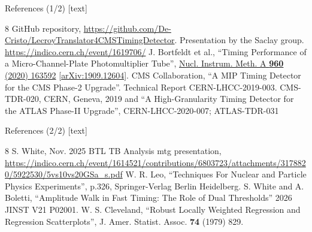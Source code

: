 \begin{frame}{References (1/2)}
\fontsize{9}{10.5}\selectfont
{}[text]
\begin{thebibliography}{8}
GitHub repository,
\url{https://github.com/De-Cristo/LecroyTranslator4CMSTimingDetector}.
Presentation by the Saclay group. \url{https://indico.cern.ch/event/1619706/}
J. Bortfeldt et al., ``Timing Performance of a Micro-Channel-Plate Photomultiplier Tube'',
\href{https://doi.org/10.1016/j.nima.2020.163592}{Nucl. Instrum. Meth. A \textbf{960} (2020) 163592}
[\href{https://arxiv.org/abs/1909.12604}{arXiv:1909.12604}].
CMS Collaboration, ``A MIP Timing Detector for the CMS Phase-2 Upgrade''.
Technical Report CERN-LHCC-2019-003. CMS-TDR-020, CERN, Geneva, 2019 and
``A High-Granularity Timing Detector for the ATLAS Phase-II Upgrade'',
CERN-LHCC-2020-007; ATLAS-TDR-031
\end{thebibliography}
\end{frame}

\begin{frame}{References (2/2)}
\fontsize{9}{10.5}\selectfont
{}[text]
\begin{thebibliography}{8}
S. White, Nov. 2025 BTL TB Analysis mtg presentation,
\url{https://indico.cern.ch/event/1614521/contributions/6803723/attachments/3178820/5922530/5vs10vs20GSa_s.pdf}
W. R. Leo, ``Techniques For Nuclear and Particle Physics Experiments'',
p.326, Springer-Verlag Berlin Heidelberg.
S. White and A. Boletti, ``Amplitude Walk in Fast Timing: The Role of Dual Thresholds''
2026 JINST V21 P02001.
W. S. Cleveland, ``Robust Locally Weighted Regression and Regression Scatterplots'',
J. Amer. Statist. Assoc. \textbf{74} (1979) 829.
\end{thebibliography}
\end{frame}
